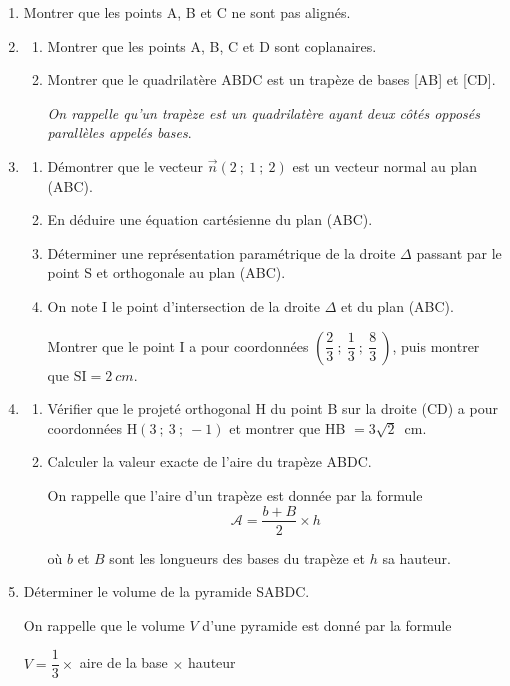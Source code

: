 \documentclass[10pt]{article}
\providecommand{\vect}[1]{\overrightarrow{#1}}
\providecommand{\np}[2][]{{#2~#1}}
\begin{document}
\begin{enumerate}
\item Montrer que les points A, B et C ne sont pas alignés.
\item
	\begin{enumerate}
		\item Montrer que les points A, B, C et D sont coplanaires.
		\item Montrer que le quadrilatère ABDC est un trapèze de bases [AB] et [CD].

\emph{On rappelle qu'un trapèze est un quadrilatère ayant deux côtés opposés parallèles appelés bases}.
	\end{enumerate}
\item
	\begin{enumerate}
		\item Démontrer que le vecteur $\vect{n}(2~;~1~;~2)$ est un vecteur normal au plan (ABC).
		\item En déduire une équation cartésienne du plan (ABC).
		\item Déterminer une représentation paramétrique de la droite $\Delta$ passant par le point S et orthogonale au plan (ABC).
		\item On note I le point d'intersection de la droite $\Delta$ et du plan (ABC).

Montrer que le point I a pour coordonnées $\left(\dfrac23~;~\dfrac13~;~\dfrac83~\right)$, puis montrer que $\mathrm{SI} = \np[cm]{2}$.
		\end{enumerate}
\item
	\begin{enumerate}
		\item Vérifier que le projeté orthogonal H du point B sur la droite (CD) a pour coordonnées H$(3~;~3~;~-1)$ et montrer que HB $= 3\sqrt 2$~cm.
		\item Calculer la valeur exacte de l'aire du trapèze ABDC.

On rappelle que l'aire d'un trapèze est donnée par la formule
\[\mathcal{A} = \dfrac{b + B}{2} \times h\]

où $b$ et $B$ sont les longueurs des bases du trapèze et $h$ sa hauteur.
		\end{enumerate}
\item Déterminer le volume de la pyramide SABDC.

On rappelle que le volume $V$ d'une pyramide est donné par la formule

\begin{center}$V = \dfrac13 \times$  aire de la base $\times$ hauteur\end{center}
\end{enumerate}

\bigskip
\end{document}
